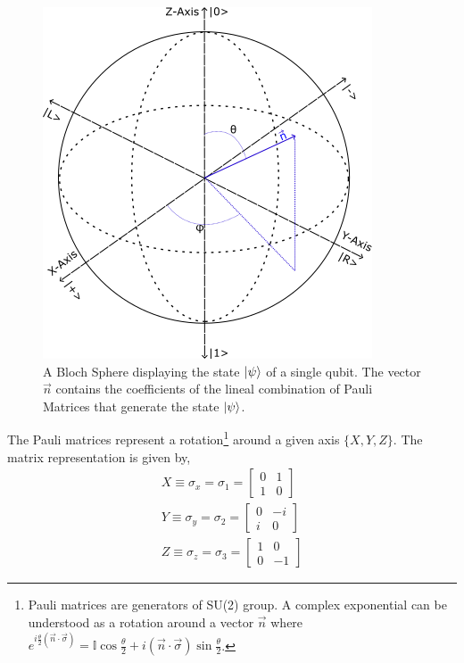 \begin{figure}[h]
    \centering
    \includegraphics[scale=2.0]{Figures/BlochSphere.png}
    \caption{A Bloch Sphere displaying the state $\ket{\psi}$ of a single qubit. The vector $\vec{n}$ contains the coefficients of the lineal combination of Pauli Matrices that generate the state $\ket{\psi}$.}
    \label{fig:bloch_sphere}
\end{figure}
The Pauli matrices represent a rotation\footnote{Pauli matrices are generators of SU(2) group. A complex exponential can be understood as a rotation around a vector $\vec{n}$ where $e^{i\frac{\theta}{2}(\vec{n}\cdot \vec{\sigma})} = \mathbb{I}\cos{\frac{\theta}{2}} + i(\vec{n}\cdot \vec{\sigma})\sin{\frac{\theta}{2}}$.} around a given axis $\{X, Y, Z \}$. The matrix representation is given by,
\begin{align*}
X \equiv \sigma_{x} = \sigma_{1} = 
    \begin{bmatrix}
           0 & 1 \\
           1 & 0 
         \end{bmatrix} \\
Y \equiv \sigma_{y} = \sigma_{2} = 
    \begin{bmatrix}
           0 & -i \\
           i & 0 
         \end{bmatrix} \\ 
Z \equiv \sigma_{z} = \sigma_{3} = 
    \begin{bmatrix}
           1 & 0 \\
           0 & -1 
         \end{bmatrix}
\end{align*}

